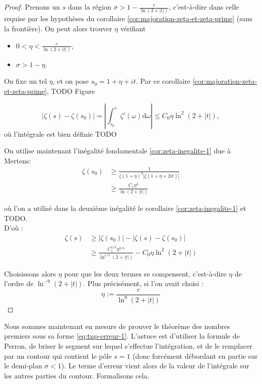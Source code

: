 \documentclass[french]{report}
\begin{document}
\begin{proof}
  Prenons un $s$ dans la région $\sigma > 1-\frac{c}{\ln(2+|t|)}$, c'est-à-dire dans celle requise par les hypothèses du corollaire \ref{cor:majoration-zeta-et-zeta-prime} (sans la frontière). On peut alors trouver $\eta$ vérifiant
  \begin{itemize}
    \item $0<\eta<\frac{c}{\ln(2 + |t|)}$,
    \item $\sigma > 1-\eta$.
  \end{itemize}

  On fixe un tel $\eta$, et on pose $s_0=1+\eta+it$. Par ce corollaire \ref{cor:majoration-zeta-et-zeta-prime},
  TODO Figure

  \[ |\zeta(s)-\zeta(s_0)|
  = \left|\int_{s_0}^s\zeta'(\omega)\mathrm{d}\omega\right|
  \leq C_0\eta\ln^2(2+|t|),
  \]
  où l'intégrale est bien définie TODO

  On utilise maintenant l'inégalité fondamentale \ref{cor:zeta-inegalite-1} due à Mertens:
  \begin{align*}
    \zeta(s_0)
    &\geq \frac{1}{\zeta(1+\eta)^3|\zeta(1+\eta+2it)|} \\
    &\geq \frac{C_1\eta^3}{\ln(2+|t|)}
  \end{align*}

  où l'on a utilisé dans la deuxième inégalité le corollaire \ref{cor:zeta-inegalite-1} et TODO.
  \\

  D'où :
  \begin{align*}
    \zeta(s)
    &\geq |\zeta(s_0)| - |\zeta(s)-\zeta(s_0)| \\
    &\geq \frac{C_1^{1/4}\eta^{3/4}}{\ln^{1/4}(2+|t|)} - C_0\eta\ln^2(2+|t|)
  \end{align*}

  Choisissons alors $\eta$ pour que les deux termes se compensent, c'est-à-dire $\eta$ de l'ordre de $\ln^{-9}(2+|t|)$. Plus précisément, si l'on avait choisi :
  \[ \eta:=\frac{c}{\ln^9(2+|t|)} \]
\end{proof}

Nous sommes maintenant en mesure de prouver le théorème des nombres premiers sous sa forme \ref{eq:tnp-erreur-1}. L'astuce est d'utiliser la formule de Perron, de briser le segment sur lequel s'effectue l'intégration, et de le remplacer par un contour qui contient le pôle $s=1$ (donc forcément débordant en partie sur le demi-plan $\sigma<1$). Le terme d'erreur vient alors de la valeur de l'intégrale sur les autres parties du contour. Formalisons cela.
\end{document}
